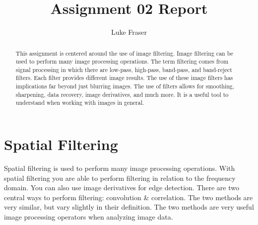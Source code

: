 \documentclass[letterpaper,10pt]{article}
\title{Assignment 02 Report}
\author{Luke Fraser}
\begin{document}
\maketitle

\begin{abstract}
This assignment is centered around the use of image filtering. Image filtering can be used to perform many image processing operations. The term filtering comes from signal processing in which there are low-pass, high-pass, band-pass, and band-reject filters. Each filter provides different image results. The use of these image filters has implications far beyond just blurring images. The use of filters allows for smoothing, sharpening, data recovery, image derivatives, and much more. It is a useful tool to understand when working with images in general.
\end{abstract}

\section{Spatial Filtering}
Spatial filtering is used to perform many image processing operations. With spatial filtering you are able to perform filtering in relation to the frequency domain. You can also use image derivatives for edge detection. There are two central ways to perform filtering: convolution \& correlation. The two methods are very similar, but vary slightly in their definition. The two methods are very useful image processing operators when analyzing image data.	
\end{document}
